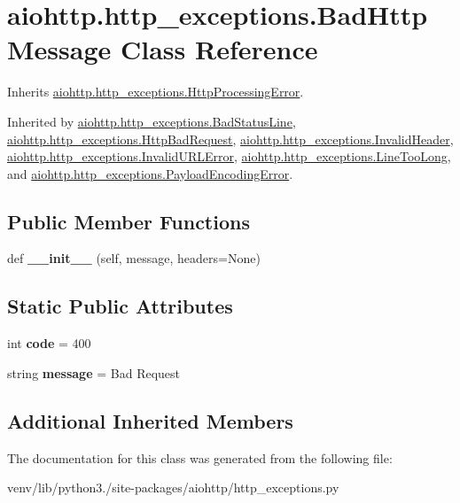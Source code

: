 \hypertarget{classaiohttp_1_1http__exceptions_1_1_bad_http_message}{}\section{aiohttp.\+http\+\_\+exceptions.\+Bad\+Http\+Message Class Reference}
\label{classaiohttp_1_1http__exceptions_1_1_bad_http_message}


Inherits \hyperlink{classaiohttp_1_1http__exceptions_1_1_http_processing_error}{aiohttp.\+http\+\_\+exceptions.\+Http\+Processing\+Error}.



Inherited by \hyperlink{classaiohttp_1_1http__exceptions_1_1_bad_status_line}{aiohttp.\+http\+\_\+exceptions.\+Bad\+Status\+Line}, \hyperlink{classaiohttp_1_1http__exceptions_1_1_http_bad_request}{aiohttp.\+http\+\_\+exceptions.\+Http\+Bad\+Request}, \hyperlink{classaiohttp_1_1http__exceptions_1_1_invalid_header}{aiohttp.\+http\+\_\+exceptions.\+Invalid\+Header}, \hyperlink{classaiohttp_1_1http__exceptions_1_1_invalid_u_r_l_error}{aiohttp.\+http\+\_\+exceptions.\+Invalid\+U\+R\+L\+Error}, \hyperlink{classaiohttp_1_1http__exceptions_1_1_line_too_long}{aiohttp.\+http\+\_\+exceptions.\+Line\+Too\+Long}, and \hyperlink{classaiohttp_1_1http__exceptions_1_1_payload_encoding_error}{aiohttp.\+http\+\_\+exceptions.\+Payload\+Encoding\+Error}.

\subsection*{Public Member Functions}
\begin{DoxyCompactItemize}
\item 
\mbox{\label{classaiohttp_1_1http__exceptions_1_1_bad_http_message_a9fb402de165c68fbe1560584947a0ffd}} 
def {\bfseries \+\_\+\+\_\+init\+\_\+\+\_\+} (self, message, headers=None)
\end{DoxyCompactItemize}
\subsection*{Static Public Attributes}
\begin{DoxyCompactItemize}
\item 
\mbox{\label{classaiohttp_1_1http__exceptions_1_1_bad_http_message_abbb17e612b59a93a3ea72791b306d198}} 
int {\bfseries code} = 400
\item 
\mbox{\label{classaiohttp_1_1http__exceptions_1_1_bad_http_message_aa65bc81542082d5901f6967396f6d771}} 
string {\bfseries message} = \textquotesingle{}Bad Request\textquotesingle{}
\end{DoxyCompactItemize}
\subsection*{Additional Inherited Members}


The documentation for this class was generated from the following file\+:\begin{DoxyCompactItemize}
\item 
venv/lib/python3./site-\/packages/aiohttp/http\+\_\+exceptions.\+py\end{DoxyCompactItemize}
